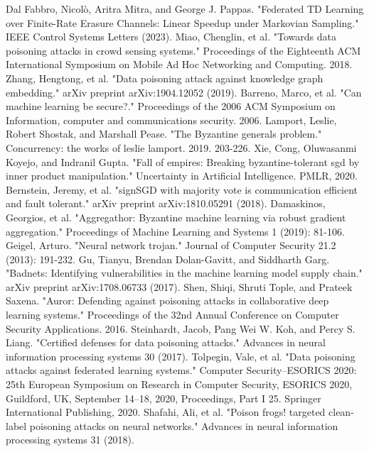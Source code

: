 \documentclass[conference]{IEEEtran}
\begin{document}
\begin{thebibliography}{00}
     Dal Fabbro, Nicolò, Aritra Mitra, and George J. Pappas. "Federated TD Learning over Finite-Rate Erasure Channels: Linear Speedup under Markovian Sampling." IEEE Control Systems Letters (2023).
     Miao, Chenglin, et al. "Towards data poisoning attacks in crowd sensing systems." Proceedings of the Eighteenth ACM International Symposium on Mobile Ad Hoc Networking and Computing. 2018.
     Zhang, Hengtong, et al. "Data poisoning attack against knowledge graph embedding." arXiv preprint arXiv:1904.12052 (2019).
     Barreno, Marco, et al. "Can machine learning be secure?." Proceedings of the 2006 ACM Symposium on Information, computer and communications security. 2006.
     Lamport, Leslie, Robert Shostak, and Marshall Pease. "The Byzantine generals problem." Concurrency: the works of leslie lamport. 2019. 203-226.
     Xie, Cong, Oluwasanmi Koyejo, and Indranil Gupta. "Fall of empires: Breaking byzantine-tolerant sgd by inner product manipulation." Uncertainty in Artificial Intelligence. PMLR, 2020.
     Bernstein, Jeremy, et al. "signSGD with majority vote is communication efficient and fault tolerant." arXiv preprint arXiv:1810.05291 (2018).
     Damaskinos, Georgios, et al. "Aggregathor: Byzantine machine learning via robust gradient aggregation." Proceedings of Machine Learning and Systems 1 (2019): 81-106.
     Geigel, Arturo. "Neural network trojan." Journal of Computer Security 21.2 (2013): 191-232.
     Gu, Tianyu, Brendan Dolan-Gavitt, and Siddharth Garg. "Badnets: Identifying vulnerabilities in the machine learning model supply chain." arXiv preprint arXiv:1708.06733 (2017).
     Shen, Shiqi, Shruti Tople, and Prateek Saxena. "Auror: Defending against poisoning attacks in collaborative deep learning systems." Proceedings of the 32nd Annual Conference on Computer Security Applications. 2016.
     Steinhardt, Jacob, Pang Wei W. Koh, and Percy S. Liang. "Certified defenses for data poisoning attacks." Advances in neural information processing systems 30 (2017).
     Tolpegin, Vale, et al. "Data poisoning attacks against federated learning systems." Computer Security–ESORICS 2020: 25th European Symposium on Research in Computer Security, ESORICS 2020, Guildford, UK, September 14–18, 2020, Proceedings, Part I 25. Springer International Publishing, 2020.
     Shafahi, Ali, et al. "Poison frogs! targeted clean-label poisoning attacks on neural networks." Advances in neural information processing systems 31 (2018).

\end{thebibliography}
\end{document}

